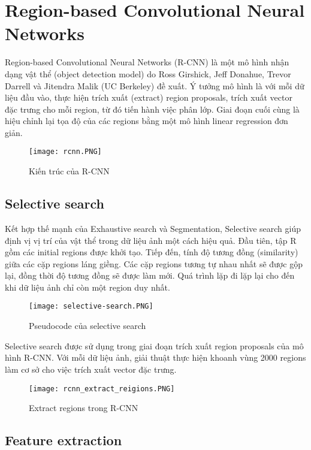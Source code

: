 \documentclass[../thesis.tex]{subfiles}
\begin{document}
\section{Region-based Convolutional Neural Networks}

Region-based Convolutional Neural Networks (R-CNN) là một mô hình nhận dạng vật thể (object detection model) do Ross Girshick, Jeff Donahue, Trevor Darrell và Jitendra Malik (UC Berkeley) đề xuất. Ý tưởng mô hình là với mỗi dữ liệu đầu vào, thực hiện trích xuất (extract) region proposals, trích xuất vector đặc trưng cho mỗi region, từ đó tiến hành việc phân lớp. Giai đoạn cuối cùng là hiệu chỉnh lại tọa độ của các regions bằng một mô hình linear regression đơn giản.

\begin{figure}[H]
	\centering
	\texttt{[image: rcnn.PNG]}
	\caption{Kiến trúc của R-CNN}\label{Fig:rcnn}
\end{figure}

\subsection{Selective search}

Kết hợp thế mạnh của Exhaustive search và Segmentation, Selective search giúp định vị vị trí của vật thể trong dữ liệu ảnh một cách hiệu quả. Đầu tiên, tập R gồm các initial regions được khởi tạo. Tiếp đến, tính độ tương đồng (similarity) giữa các cặp regions láng giềng. Các cặp regions tương tự nhau nhất sẽ được gộp lại, đồng thời độ tương đồng sẽ được làm mới. Quá trình lặp đi lặp lại cho đến khi dữ liệu ảnh chỉ còn một region duy nhất.

\begin{figure}[H]
	\centering
	\texttt{[image: selective-search.PNG]}
	\caption{Pseudocode của selective search}\label{Fig:selective_search}
\end{figure}

Selective search được sử dụng trong giai đoạn trích xuất region proposals của mô hình R-CNN. Với mỗi dữ liệu ảnh, giải thuật thực hiện khoanh vùng 2000 regions làm cơ sở cho việc trích xuất vector đặc trưng.

\begin{figure}[H]
	\centering
	\texttt{[image: rcnn\_extract\_reigions.PNG]}
	\caption{Extract regions trong R-CNN}\label{Fig:rcnn_extract_regions}
\end{figure}

\subsection{Feature extraction}
\end{document}
